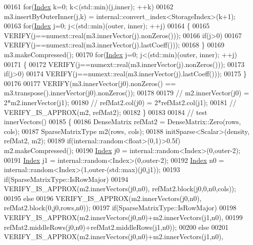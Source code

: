 \begin{DoxyCode}
00161       \textcolor{keywordflow}{for}(\hyperlink{namespace_eigen_a62e77e0933482dafde8fe197d9a2cfde}{Index} k=0; k<(std::min)(j,inner); ++k)
00162         m3.insertByOuterInner(j,k) = internal::convert\_index<StorageIndex>(k+1);
00163     \textcolor{keywordflow}{for}(\hyperlink{namespace_eigen_a62e77e0933482dafde8fe197d9a2cfde}{Index} j=0; j<(std::min)(outer, inner); ++j)
00164     \{
00165       VERIFY(j==numext::real(m3.innerVector(j).nonZeros()));
00166       \textcolor{keywordflow}{if}(j>0)
00167         VERIFY(j==numext::real(m3.innerVector(j).lastCoeff()));
00168     \}
00169     m3.makeCompressed();
00170     \textcolor{keywordflow}{for}(\hyperlink{namespace_eigen_a62e77e0933482dafde8fe197d9a2cfde}{Index} j=0; j<(std::min)(outer, inner); ++j)
00171     \{
00172       VERIFY(j==numext::real(m3.innerVector(j).nonZeros()));
00173       \textcolor{keywordflow}{if}(j>0)
00174         VERIFY(j==numext::real(m3.innerVector(j).lastCoeff()));
00175     \}
00176 
00177     VERIFY(m3.innerVector(j0).nonZeros() == m3.transpose().innerVector(j0).nonZeros());
00178 
00179 \textcolor{comment}{//     m2.innerVector(j0) = 2*m2.innerVector(j1);}
00180 \textcolor{comment}{//     refMat2.col(j0) = 2*refMat2.col(j1);}
00181 \textcolor{comment}{//     VERIFY\_IS\_APPROX(m2, refMat2);}
00182   \}
00183 
00184   \textcolor{comment}{// test innerVectors()}
00185   \{
00186     DenseMatrix refMat2 = DenseMatrix::Zero(rows, cols);
00187     SparseMatrixType m2(rows, cols);
00188     initSparse<Scalar>(density, refMat2, m2);
00189     \textcolor{keywordflow}{if}(internal::random<float>(0,1)>0.5f) m2.makeCompressed();
00190     \hyperlink{namespace_eigen_a62e77e0933482dafde8fe197d9a2cfde}{Index} j0 = internal::random<Index>(0,outer-2);
00191     \hyperlink{namespace_eigen_a62e77e0933482dafde8fe197d9a2cfde}{Index} j1 = internal::random<Index>(0,outer-2);
00192     \hyperlink{namespace_eigen_a62e77e0933482dafde8fe197d9a2cfde}{Index} n0 = internal::random<Index>(1,outer-(std::max)(j0,j1));
00193     \textcolor{keywordflow}{if}(SparseMatrixType::IsRowMajor)
00194       VERIFY\_IS\_APPROX(m2.innerVectors(j0,n0), refMat2.block(j0,0,n0,cols));
00195     \textcolor{keywordflow}{else}
00196       VERIFY\_IS\_APPROX(m2.innerVectors(j0,n0), refMat2.block(0,j0,rows,n0));
00197     \textcolor{keywordflow}{if}(SparseMatrixType::IsRowMajor)
00198       VERIFY\_IS\_APPROX(m2.innerVectors(j0,n0)+m2.innerVectors(j1,n0),
00199                        refMat2.middleRows(j0,n0)+refMat2.middleRows(j1,n0));
00200     \textcolor{keywordflow}{else}
00201       VERIFY\_IS\_APPROX(m2.innerVectors(j0,n0)+m2.innerVectors(j1,n0),

\end{DoxyCode}
